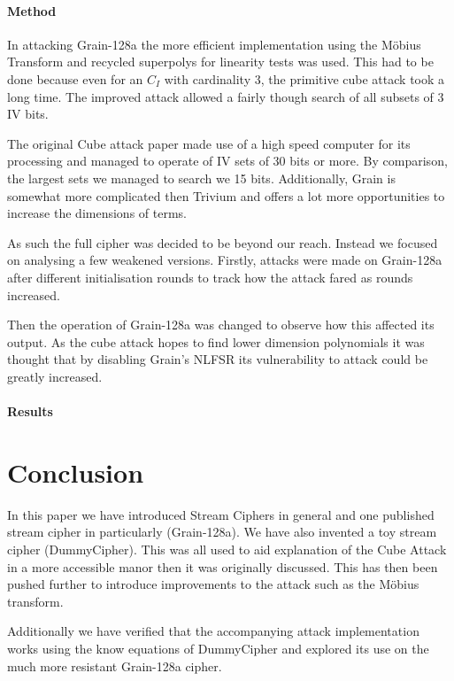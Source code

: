 \documentclass{report}
\let\Oldsubsubsection\subsubsection
\renewcommand{\subsubsection}{\FloatBarrier\Oldsubsubsection}
\begin{document}
\subsubsection{Method}
In attacking Grain-128a the more efficient implementation using the M\"{o}bius Transform and recycled superpolys for linearity tests was used. This had to be done because even for an $C_I$ with cardinality 3, the primitive cube attack took a long time. The improved attack allowed a fairly though search of all subsets of 3 IV bits.

The original Cube attack paper made use of a high speed computer for its processing and managed to operate of IV sets of 30 bits or more. By comparison, the largest sets we managed to search we 15 bits. Additionally, Grain is somewhat more complicated then Trivium and offers a lot more opportunities to increase the dimensions of terms.

As such the full cipher was decided to be beyond our reach. Instead we focused on analysing a few weakened versions. Firstly, attacks were made on Grain-128a after different initialisation rounds to track how the attack fared as rounds increased.

Then the operation of Grain-128a was changed to observe how this affected its output. As the cube attack hopes to find lower dimension polynomials it was thought that by disabling Grain's NLFSR its vulnerability to attack could be greatly increased.

\subsubsection{Results}
\begin{figure}[g]
\centering{
\resizebox{150mm}{!}{}
\label{fig:grain_chart}
}
\end{figure}
\chapter{Conclusion}
In this paper we have introduced Stream Ciphers in general and one published stream cipher in particularly (Grain-128a). We have also invented a toy stream cipher (DummyCipher). This was all used to aid explanation of the Cube Attack in a more accessible manor then it was originally discussed. This has then been pushed further to introduce improvements to the attack such as the M\"{o}bius transform.

Additionally we have verified that the accompanying attack implementation works using the know equations of DummyCipher and explored its use on the much more resistant Grain-128a cipher.
\end{document}

